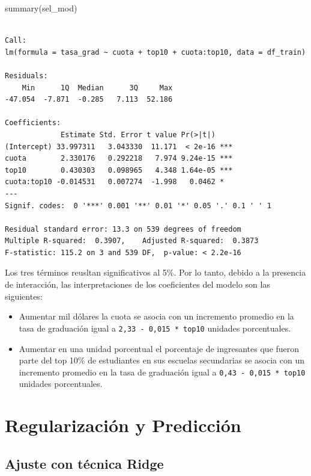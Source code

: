 \documentclass[
  letterpaper,
  DIV=11,
  numbers=noendperiod]{scrartcl}
\newenvironment{Shaded}{\begin{snugshade}}{\end{snugshade}}
\newcommand{\FunctionTok}[1]{\textcolor[rgb]{0.28,0.35,0.67}{#1}}
\newcommand{\NormalTok}[1]{\textcolor[rgb]{0.00,0.23,0.31}{#1}}
\begin{document}
\begin{Shaded}
\begin{Highlighting}[]
\FunctionTok{summary}\NormalTok{(sel\_mod)}
\end{Highlighting}
\end{Shaded}

\begin{verbatim}

Call:
lm(formula = tasa_grad ~ cuota + top10 + cuota:top10, data = df_train)

Residuals:
    Min      1Q  Median      3Q     Max 
-47.054  -7.871  -0.285   7.113  52.186 

Coefficients:
             Estimate Std. Error t value Pr(>|t|)    
(Intercept) 33.997311   3.043330  11.171  < 2e-16 ***
cuota        2.330176   0.292218   7.974 9.24e-15 ***
top10        0.430303   0.098965   4.348 1.64e-05 ***
cuota:top10 -0.014531   0.007274  -1.998   0.0462 *  
---
Signif. codes:  0 '***' 0.001 '**' 0.01 '*' 0.05 '.' 0.1 ' ' 1

Residual standard error: 13.3 on 539 degrees of freedom
Multiple R-squared:  0.3907,    Adjusted R-squared:  0.3873 
F-statistic: 115.2 on 3 and 539 DF,  p-value: < 2.2e-16
\end{verbatim}

Los tres términos reusltan significativos al 5\%. Por lo tanto, debido a
la presencia de interacción, las interpretaciones de los coeficientes
del modelo son las siguientes:

\begin{itemize}
\item
  Aumentar mil dólares la cuota se asocia con un incremento promedio en
  la tasa de graduación igual a \texttt{2,33\ -\ 0,015\ *\ top10}
  unidades porcentuales.
\item
  Aumentar en una unidad porcentual el porcentaje de ingresantes que
  fueron parte del top 10\% de estudiantes en sus escuelas secundarias
  se asocia con un incremento promedio en la tasa de graduación igual a
  \texttt{0,43\ -\ 0,015\ *\ top10} unidades porcentuales.
\end{itemize}

\hypertarget{regularizaciuxf3n-y-predicciuxf3n}{%
\section{Regularización y
Predicción}\label{regularizaciuxf3n-y-predicciuxf3n}}

\hypertarget{ajuste-con-tuxe9cnica-ridge}{%
\subsection{Ajuste con técnica
Ridge}\label{ajuste-con-tuxe9cnica-ridge}}
\end{document}
